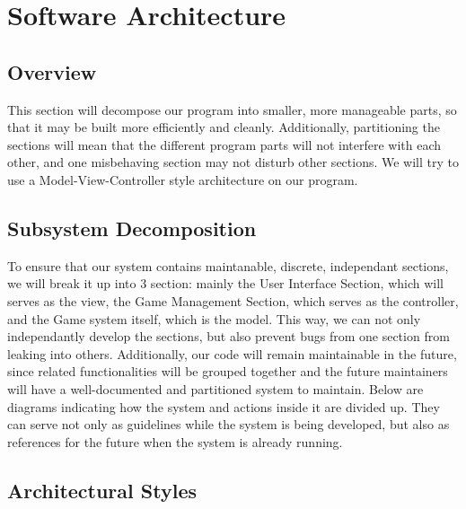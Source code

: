 \documentclass[12pt]{article} %
\begin{document}
\section{Software Architecture} %


\subsection{Overview} %

This section will decompose our program into smaller, more manageable parts, so that it may be built more efficiently and cleanly. Additionally, partitioning the sections will mean that the different program parts will not interfere with each other, and one misbehaving section may not disturb other sections. We will try to use a Model-View-Controller style architecture on our program.


\subsection{Subsystem Decomposition} %

To ensure that our system contains maintanable, discrete, independant sections, we will break it up into 3 section: mainly the User Interface Section, which will serves as the view, the Game Management Section, which serves as the controller, and the Game system itself, which is the model. This way, we can not only independantly develop the sections, but also prevent bugs from one section from leaking into others. Additionally, our code will remain maintainable in the future, since related functionalities will be grouped together and the future maintainers will have a well-documented and partitioned system to maintain.
\indent Below are diagrams indicating how the system and actions inside it are divided up. They can serve not only as guidelines while the system is being developed, but also as references for the future when the system is already running.


\subsection{Architectural Styles} %

\end{document}
